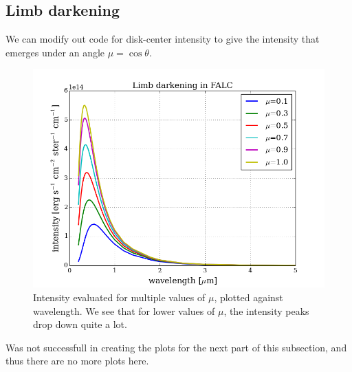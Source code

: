 \documentclass{article}
\begin{document}
\subsection{Limb darkening}
We can modify out code for disk-center intensity to give the intensity that emerges under an angle $\mu = \cos\theta$.
\begin{figure}[H]
  \centering
  \includegraphics[scale=0.5]{../figures/task2/limb_darkening_1.png}
  \caption{Intensity evaluated for multiple values of $\mu$, plotted against wavelength. We see that for lower values of $\mu$, the intensity peaks drop down quite a lot.}
\end{figure}
Was not successfull in creating the plots for the next part of this subsection, and thus there are no more plots here.
\end{document}
